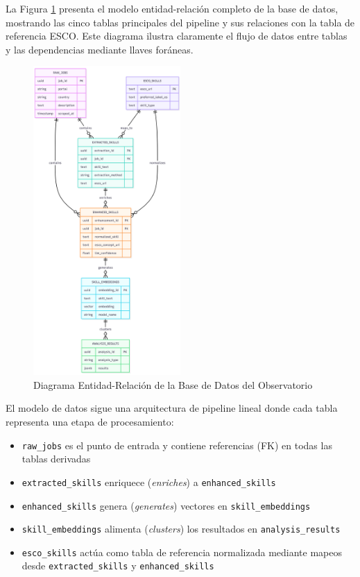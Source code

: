 La Figura \ref{fig:diagrama-er} presenta el modelo entidad-relación completo de la base de datos, mostrando las cinco tablas principales del pipeline y sus relaciones con la tabla de referencia ESCO. Este diagrama ilustra claramente el flujo de datos entre tablas y las dependencias mediante llaves foráneas.

\begin{figure}[H]
\centering
\includegraphics[width=0.5\textwidth]{diagrams/DiagramaER.png}
\caption{Diagrama Entidad-Relación de la Base de Datos del Observatorio}
\label{fig:diagrama-er}
\end{figure}

El modelo de datos sigue una arquitectura de pipeline lineal donde cada tabla representa una etapa de procesamiento:

\begin{itemize}
    \item \texttt{raw\_jobs} es el punto de entrada y contiene referencias (FK) en todas las tablas derivadas
    \item \texttt{extracted\_skills} enriquece (\textit{enriches}) a \texttt{enhanced\_skills}
    \item \texttt{enhanced\_skills} genera (\textit{generates}) vectores en \texttt{skill\_embeddings}
    \item \texttt{skill\_embeddings} alimenta (\textit{clusters}) los resultados en \texttt{analysis\_results}
    \item \texttt{esco\_skills} actúa como tabla de referencia normalizada mediante mapeos desde \texttt{extracted\_skills} y \texttt{enhanced\_skills}
\end{itemize}

